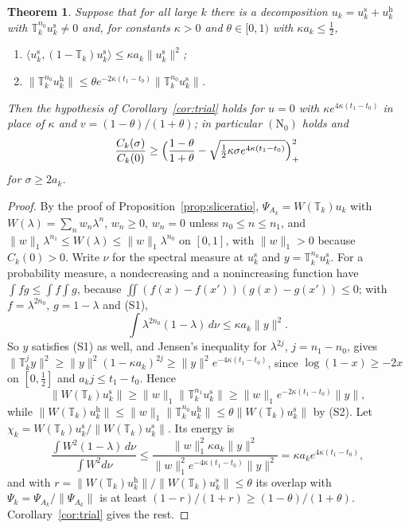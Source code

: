 \documentclass[aps,prd,twocolumn,superscriptaddress,nofootinbib,longbibliography,floatfix,amsmath,amssymb,10pt]{revtex4-2}
\newtheorem{theorem}{Theorem}
\theoremstyle{definition}
\theoremstyle{remark}
\newcommand{\ip}[2]{\langle #1,#2\rangle}
\begin{document}
\begin{theorem}\label{thm:softhard}
Suppose that for all large $k$ there is a decomposition
$u_k=u^{\mathrm s}_k+u^{\mathrm h}_k$ with $\mathbb T_k^{n_0}u^{\mathrm s}_k\ne0$
and, for constants $\kappa>0$ and $\theta\in[0,1)$ with $\kappa a_k\le\frac12$,
\begin{enumerate}[label=\textup{(S\arabic*)},leftmargin=*]
\item $\ip{u^{\mathrm s}_k}{(1-\mathbb T_k)u^{\mathrm s}_k}\le\kappa a_k
\|u^{\mathrm s}_k\|^2$;
\item $\|\mathbb T_k^{n_0}u^{\mathrm h}_k\|\le\theta e^{-2\kappa(t_1-t_0)}
\|\mathbb T_k^{n_0}u^{\mathrm s}_k\|$.
\end{enumerate}
Then the hypothesis of Corollary~\textup{\ref{cor:trial}} holds for $u=0$
with $\kappa e^{4\kappa(t_1-t_0)}$ in place of $\kappa$ and
$v=(1-\theta)/(1+\theta)$; in particular $(\mathrm N_0)$ holds and
\[
\frac{C_k(\sigma)}{C_k(0)}\ge\Bigl(\frac{1-\theta}{1+\theta}-
\sqrt{\tfrac12\kappa\sigma e^{4\kappa(t_1-t_0)}}\Bigr)_+^2
\]
for $\sigma\ge2a_k$.
\end{theorem}

\begin{proof}
By the proof of Proposition~\ref{prop:sliceratio},
$\Psi_{A_k}=W(\mathbb T_k)u_k$ with $W(\lambda)=\sum_nw_n\lambda^n$, $w_n\ge0$,
$w_n=0$ unless $n_0\le n\le n_1$, and $\|w\|_1\lambda^{n_1}\le W(\lambda)\le
\|w\|_1\lambda^{n_0}$ on $[0,1]$, with $\|w\|_1>0$ because $C_k(0)>0$. Write
$\nu$ for the spectral measure at $u^{\mathrm s}_k$ and
$y=\mathbb T_k^{n_0}u^{\mathrm s}_k$. For a probability measure, a
nondecreasing and a nonincreasing function have $\int fg\le\int f\int g$,
because $\iint(f(x)-f(x'))(g(x)-g(x'))\le0$; with $f=\lambda^{2n_0}$,
$g=1-\lambda$ and (S1),
\[
\int\lambda^{2n_0}(1-\lambda)\,d\nu\le\kappa a_k\|y\|^2 .
\]
So $y$ satisfies (S1) as well, and Jensen's inequality for $\lambda^{2j}$,
$j=n_1-n_0$, gives $\|\mathbb T_k^jy\|^2\ge\|y\|^2(1-\kappa a_k)^{2j}\ge
\|y\|^2e^{-4\kappa(t_1-t_0)}$, since $\log(1-x)\ge-2x$ on $[0,\frac12]$ and
$a_kj\le t_1-t_0$. Hence
\[
\|W(\mathbb T_k)u^{\mathrm s}_k\|\ge\|w\|_1\|\mathbb T_k^{n_1}u^{\mathrm s}_k\|
\ge\|w\|_1e^{-2\kappa(t_1-t_0)}\|y\| ,
\]
while $\|W(\mathbb T_k)u^{\mathrm h}_k\|\le\|w\|_1\|\mathbb T_k^{n_0}
u^{\mathrm h}_k\|\le\theta\|W(\mathbb T_k)u^{\mathrm s}_k\|$ by (S2). Let
$\chi_k=W(\mathbb T_k)u^{\mathrm s}_k/\|W(\mathbb T_k)u^{\mathrm s}_k\|$. Its
energy is
\[
\frac{\int W^2(1-\lambda)\,d\nu}{\int W^2d\nu}\le
\frac{\|w\|_1^2\kappa a_k\|y\|^2}{\|w\|_1^2e^{-4\kappa(t_1-t_0)}\|y\|^2}
=\kappa a_ke^{4\kappa(t_1-t_0)} ,
\]
and with $r=\|W(\mathbb T_k)u^{\mathrm h}_k\|/\|W(\mathbb T_k)u^{\mathrm s}_k\|
\le\theta$ its overlap with $\Psi_k=\Psi_{A_k}/\|\Psi_{A_k}\|$ is at least
$(1-r)/(1+r)\ge(1-\theta)/(1+\theta)$. Corollary~\ref{cor:trial} gives the
rest.
\end{proof}
\end{document}
